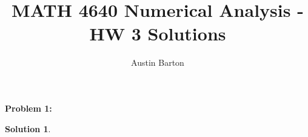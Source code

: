 \documentclass[12pt, letterpaper]{article}
\title{MATH 4640 Numerical Analysis - HW 3 Solutions}
\author{Austin Barton}
\theoremstyle{nonumberplain}
\newtheorem{sol}{Solution}
\begin{document}
\maketitle

\vspace{2em}

\hspace{18pt}\textbf{Problem 1:} \medskip
\begin{sol}
    
\end{sol}
\end{document}
